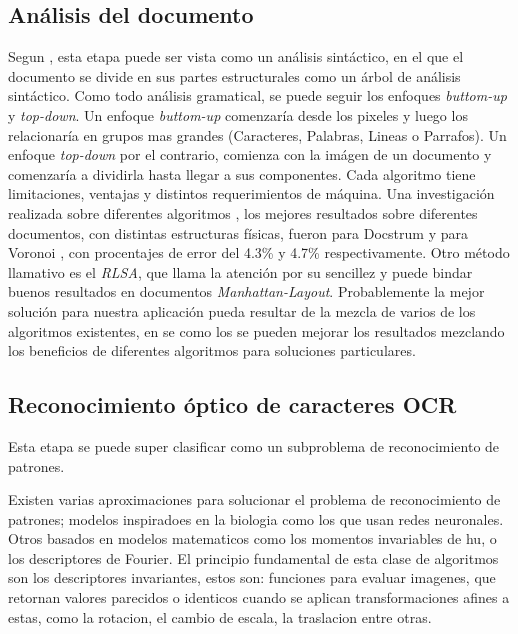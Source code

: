\documentclass{article}
\begin{document}
	\subsection{Análisis del documento}
	Segun \cite{doc_analysis2}, esta etapa puede ser vista como un análisis sintáctico,
	en el que el documento se divide en sus partes estructurales como un árbol de análisis
	sintáctico. Como todo análisis gramatical, se puede seguir los enfoques
	\textit{buttom-up} y \textit{top-down}. Un enfoque \textit{buttom-up} comenzaría desde
	los pixeles y luego los relacionaría en grupos mas grandes (Caracteres, Palabras, Lineas
	o Parrafos). Un enfoque \textit{top-down} por el contrario, comienza con la imágen de un
	documento y comenzaría a dividirla hasta llegar a sus componentes.
	Cada algoritmo tiene limitaciones, ventajas y distintos requerimientos de máquina.
	Una investigación realizada sobre diferentes algoritmos \cite{benchmark1}, los
	mejores resultados sobre diferentes documentos, con distintas estructuras físicas,
	fueron para Docstrum \cite{docstrum93} y para Voronoi \cite{voronoi1}, con procentajes
	de error del 4.3\% y 4.7\% respectivamente. Otro método
	llamativo es el \textit{RLSA}, que llama la atención por su sencillez y puede bindar
	buenos resultados en documentos \textit{Manhattan-Layout}\cite{RLSA1}.
	Probablemente la mejor solución para nuestra aplicación pueda resultar de la mezcla de
	varios de los algoritmos existentes, en \cite{voronoi2} se como los se pueden mejorar
	los resultados mezclando los beneficios de diferentes algoritmos para soluciones
	particulares.
	
	\subsection{Reconocimiento óptico de caracteres OCR}
	Esta etapa se puede super clasificar como un subproblema de reconocimiento de patrones.
	
	Existen varias aproximaciones para solucionar el problema de reconocimiento de patrones; 
	modelos inspiradoes en la biologia como los que usan redes neuronales\cite{im_biology}. Otros basados en modelos matematicos
	como los momentos invariables de hu\cite{art_hu}, o los descriptores de Fourier. El principio fundamental de esta clase de algoritmos son
	los descriptores invariantes, estos son: funciones para evaluar imagenes, que retornan valores parecidos o identicos cuando se aplican
	transformaciones afines a estas, como la rotacion, el cambio de escala, la traslacion entre otras.
	
\end{document}
